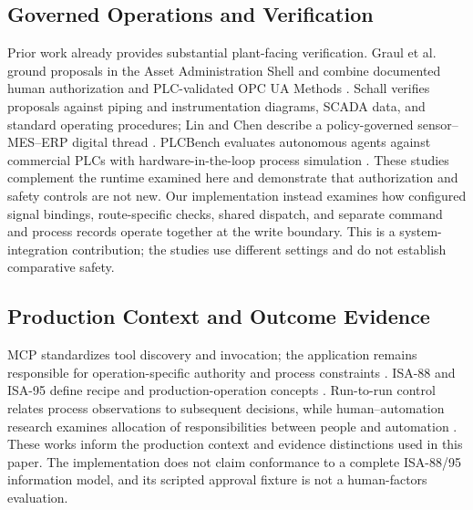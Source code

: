 \subsection{Governed Operations and Verification}
Prior work already provides substantial plant-facing verification. Graul et al. ground proposals in the Asset Administration Shell and combine documented human authorization and PLC-validated OPC UA Methods \cite{graul2026aas}. Schall verifies proposals against piping and instrumentation diagrams, SCADA data, and standard operating procedures; Lin and Chen describe a policy-governed sensor--MES--ERP digital thread \cite{schall2026safe,lin2026agentic}. PLCBench evaluates autonomous agents against commercial PLCs with hardware-in-the-loop process simulation \cite{zhou2026plcbench}. These studies complement the runtime examined here and demonstrate that authorization and safety controls are not new. Our implementation instead examines how configured signal bindings, route-specific checks, shared dispatch, and separate command and process records operate together at the write boundary. This is a system-integration contribution; the studies use different settings and do not establish comparative safety.

\subsection{Production Context and Outcome Evidence}
MCP standardizes tool discovery and invocation; the application remains responsible for operation-specific authority and process constraints \cite{mcp2024}. ISA-88 and ISA-95 define recipe and production-operation concepts \cite{isa88_2010,isa95_2025}. Run-to-run control relates process observations to subsequent decisions, while human--automation research examines allocation of responsibilities between people and automation \cite{moyne2000r2r,parasuraman2000model}. These works inform the production context and evidence distinctions used in this paper. The implementation does not claim conformance to a complete ISA-88/95 information model, and its scripted approval fixture is not a human-factors evaluation.
